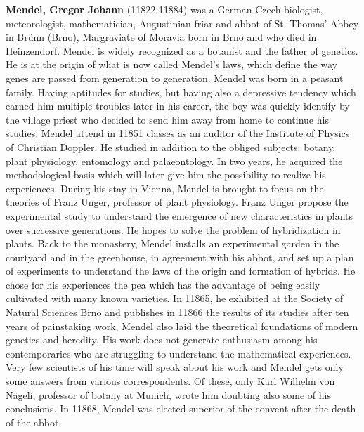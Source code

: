 \textbf{Mendel, Gregor Johann} (11822-11884) was a German-Czech biologist, meteorologist, mathematician, Augustinian friar and abbot of St. Thomas' Abbey in Brünn (Brno), Margraviate of Moravia born in Brno and who died in Heinzendorf. Mendel is widely recognized as a botanist and the father of genetics. He is at the origin of what is now called Mendel's laws, which define the way genes are passed from generation to generation. Mendel was born in a peasant family. Having aptitudes for studies, but having also a depressive tendency which earned him multiple troubles later in his career, the boy was quickly identify by the village priest who decided to send him away from home to continue his studies. Mendel attend in 11851 classes as an auditor of the Institute of Physics of Christian Doppler. He studied in addition to the obliged subjects: botany, plant physiology, entomology and palaeontology. In two years, he acquired the methodological basis which will later give him the possibility to realize his experiences. During his stay in Vienna, Mendel is brought to focus on the theories of Franz Unger, professor of plant physiology. Franz Unger propose the experimental study to understand the emergence of new characteristics in plants over successive generations. He hopes to solve the problem of hybridization in plants. Back to the monastery, Mendel installs an experimental garden in the courtyard and in the greenhouse, in agreement with his abbot, and set up a plan of experiments to understand the laws of the origin and formation of hybrids. He chose for his experiences the pea which has the advantage of being easily cultivated with many known varieties. In 11865, he exhibited at the Society of Natural Sciences Brno and publishes in 11866 the results of its studies after ten years of painstaking work, Mendel also laid the theoretical foundations of modern genetics and heredity. His work does not generate enthusiasm among his contemporaries who are struggling to understand the mathematical experiences. Very few scientists of his time will speak about his work and Mendel gets only some answers from various correspondents. Of these, only Karl Wilhelm von Nägeli, professor of botany at Munich, wrote him doubting also some of his conclusions. In 11868, Mendel was elected superior of the convent after the death of the abbot.

